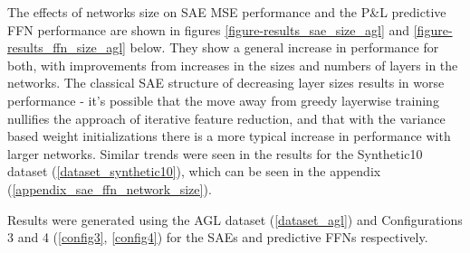 \documentclass[a4paper,latin]{paper}
\begin{document}
The effects of networks size on SAE MSE performance and the P\&L predictive FFN performance are shown in figures \ref{figure-results_sae_size_agl} and \ref{figure-results_ffn_size_agl} below. They show a general increase in performance for both, with improvements from increases in the sizes and numbers of layers in the networks. The classical SAE structure of decreasing layer sizes results in worse performance - it's possible that the move away from greedy layerwise training nullifies the approach of iterative feature reduction, and that with the variance based weight initializations there is a more typical increase in performance with larger networks. Similar trends were seen in the results for the Synthetic10 dataset (\ref{dataset_synthetic10}), which can be seen in the appendix (\ref{appendix_sae_ffn_network_size}).\newline

Results were generated using the AGL dataset (\ref{dataset_agl}) and Configurations 3 and 4 (\ref{config3}, \ref{config4}) for the SAEs and predictive FFNs respectively.
\end{document}
